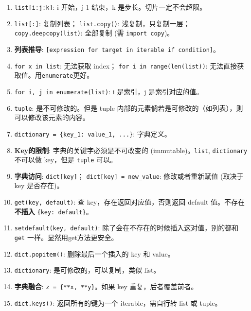 \documentclass[a4paper, 12pt]{article}
\newcommand{\code}[1]{\texttt{\color{blue!60!black}#1}}
\newcommand{\kw}[1]{\textbf{#1}} %
\newcommand{\threedigits}[1]{%
  \ifnum#1<10 00#1%
  \else\ifnum#1<100 0#1%
  \else #1%
  \fi\fi%
}
\begin{document}
\begin{enumerate}[label=\textbf{\protect\threedigits{\value*}.}, leftmargin=3.5em, itemsep=0.8ex, parsep=0.5ex]
    \item \code{list[i:j:k]}: i 开始，j-1 结束，k 是步长。切片一定不会超限。
    
    \item \code{list[:]}: 复制列表； \code{list.copy()}: 浅复制，只复制一层； \code{copy.deepcopy(list)}: 全部复制 (需 \code{import copy})。
    
    \item \kw{列表推导}: \code{[expression for target in iterable if condition]}。
    
    \item \code{for x in list}: 无法获取 index； \code{for i in range(len(list))}: 无法直接获取值。用\code{enumerate}更好。
    
    \item \code{for i, j in enumerate(list)}: i 是索引，j 是索引对应的值。
    
    \item \code{tuple}: 是不可修改的。但是 tuple 内部的元素倘若是可修改的（如列表），则可以修改该元素的内容。
    
    \item \code{dictionary = \{key\_1: value\_1, ...\}}: 字典定义。
    
    \item \kw{Key的限制}: 字典的关键字必须是不可改变的 (immutable)。\code{list}, \code{dictionary} 不可以做 key，但是 \code{tuple} 可以。
    
    \item \kw{字典访问}: \code{dict[key]}； \code{dict[key] = new\_value}: 修改或者重新赋值 (取决于 key 是否存在)。
    
    \item \code{get(key, default)}: 查 key，存在返回对应值，否则返回 default 值。不存在\textbf{不插入} \code{\{key: default\}}。
    
    \item \code{setdefault(key, default)}: 除了会在不存在的时候插入这对值，别的都和 \code{get} 一样。显然用get方法更安全。
    
    \item \code{dict.popitem()}: 删除最后一个插入的 key 和 value。
    
    \item \code{dictionary}: 是可修改的，可以复制，类似 list。
    
    \item \kw{字典融合}: \code{z = \{**x, **y\}}。如果 key 重复，后者覆盖前者。
    
    \item \code{dict.keys()}: 返回所有的键为一个 iterable，需自行转 list 或 tuple。
    

\end{enumerate}
\end{document}
